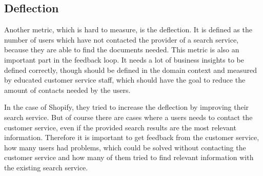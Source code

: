 \subsection{Deflection}
Another metric, which is hard to measure, is the deflection.
It is defined as the number of users which have not contacted the provider of a search service, 
because they are able to find the documents needed.
This metric is also an important part in the  feedback loop.
It needs a lot of business insights to be defined correctly,
though should be defined in the domain context and measured by educated customer service staff,
which should have the goal to reduce the amount of contacts needed by the users.
\par
In the case of Shopify, they tried to increase the deflection by improving their search service.
But of course there are cases where a users needs to contact the customer service,
even if the provided search results are the most relevant information.
Therefore it is important to get feedback from the customer service,
how many users had problems, which could be solved without contacting the customer service
and how many of them tried to find relevant information with the existing search service.\cite{shopify_engineering_2021}
